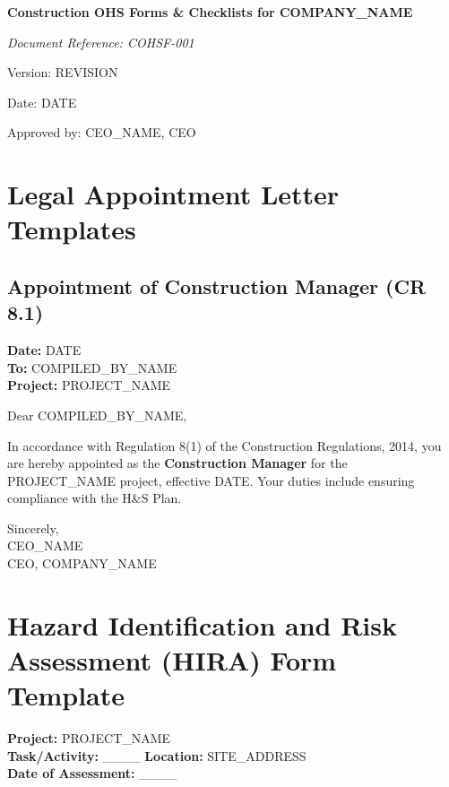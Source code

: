 \documentclass[12pt]{article}
\begin{document}
\begin{titlepage}
    \centering
    \vspace*{2cm}
    {\LARGE\bfseries Construction OHS Forms \& Checklists for {{COMPANY_NAME}}\par}
    \vspace{1cm}
    {\large\itshape Document Reference: COHSF-001\par}
    \vspace{0.5cm}
    {\normalsize Version: {{REVISION}}\par}
    \vspace{0.5cm}
    {\normalsize Date: {{DATE}}\par}
    \vspace{2cm}
    {\normalsize Approved by: {{CEO_NAME}}, CEO\par}
\end{titlepage}

\section{Legal Appointment Letter Templates}

\subsection{Appointment of Construction Manager (CR 8.1)}
\textbf{Date:} {{DATE}}\\
\textbf{To:} {{COMPILED_BY_NAME}}\\
\textbf{Project:} {{PROJECT_NAME}}

Dear {{COMPILED_BY_NAME}},

In accordance with Regulation 8(1) of the Construction Regulations, 2014, you are hereby appointed as the \textbf{Construction Manager} for the {{PROJECT_NAME}} project, effective {{DATE}}. Your duties include ensuring compliance with the H\&S Plan.

Sincerely,\\
{{CEO_NAME}}\\
CEO, {{COMPANY_NAME}}

\section{Hazard Identification and Risk Assessment (HIRA) Form Template}

\textbf{Project:} {{PROJECT_NAME}}\\
\textbf{Task/Activity:} \_\_\_\_ \textbf{Location:} {{SITE_ADDRESS}}\\
\textbf{Date of Assessment:} \_\_\_\_
\end{document}
